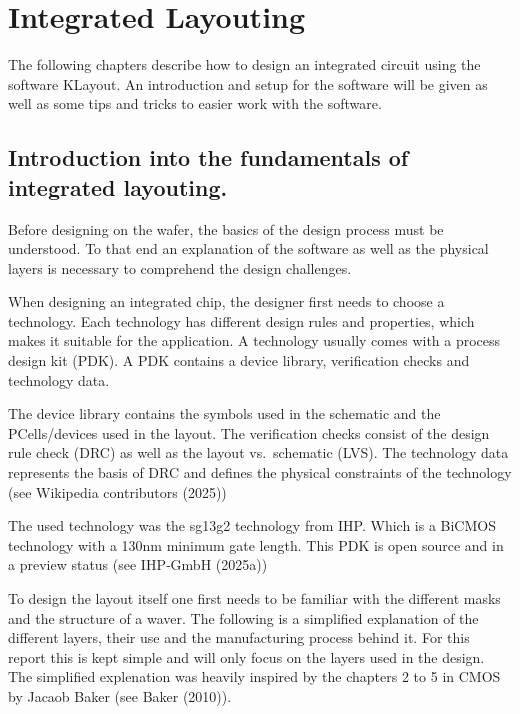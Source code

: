 \documentclass[
  letterpaper,
]{scrbook}
\begin{document}

\chapter{Integrated Layouting}\label{integrated-layouting}

The following chapters describe how to design an integrated circuit
using the software KLayout. An introduction and setup for the software
will be given as well as some tips and tricks to easier work with the
software.

\section{Introduction into the fundamentals of integrated
layouting.}\label{introduction-into-the-fundamentals-of-integrated-layouting.}

Before designing on the wafer, the basics of the design process must be
understood. To that end an explanation of the software as well as the
physical layers is necessary to comprehend the design challenges.

When designing an integrated chip, the designer first needs to choose a
technology. Each technology has different design rules and properties,
which makes it suitable for the application. A technology usually comes
with a process design kit (PDK). A PDK contains a device library,
verification checks and technology data.

The device library contains the symbols used in the schematic and the
PCells/devices used in the layout. The verification checks consist of
the design rule check (DRC) as well as the layout vs.~schematic (LVS).
The technology data represents the basis of DRC and defines the physical
constraints of the technology (see Wikipedia contributors (2025))

The used technology was the sg13g2 technology from IHP. Which is a
BiCMOS technology with a 130nm minimum gate length. This PDK is open
source and in a preview status (see IHP‑GmbH (2025a))

To design the layout itself one first needs to be familiar with the
different masks and the structure of a waver. The following is a
simplified explanation of the different layers, their use and the
manufacturing process behind it. For this report this is kept simple and
will only focus on the layers used in the design. The simplified
explenation was heavily inspired by the chapters 2 to 5 in CMOS by
Jacaob Baker (see Baker (2010)).
\end{document}
